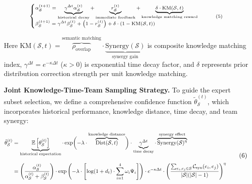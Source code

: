 \begin{equation}
\scriptsize
\begin{cases}
\alpha_{\mathcal{S}}^{(t+1)} = \underbrace{\gamma^{\Delta t} \alpha_{\mathcal{S}}^{(t)}}_{\text{historical decay}} 
+ \underbrace{r_{\mathcal{S}}^{(t)}}_{\text{immediate feedback}} 
+ \underbrace{\delta \cdot \mathrm{KM}(\mathcal{S}, t)}_{\text{knowledge matching reward}} \\[8pt]
\beta_{\mathcal{S}}^{(t+1)} = \gamma^{\Delta t} \beta_{\mathcal{S}}^{(t)} 
+ \left(1 - r_{\mathcal{S}}^{(t)}\right) 
+ \delta \cdot \left(1 - \mathrm{KM}(\mathcal{S}, t)\right)
\end{cases} 
\tag{5} 
\label{eq:emc5}
\end{equation}

Here $\mathrm{KM}(\mathcal{S}, t) = \overbrace{\rho_{\text{overlap}}}^{\text{semantic matching}} \cdot \underbrace{\mathrm{Synergy}(\mathcal{S})}_{\text{synergy gain}}$ is composite knowledge matching index, $\gamma^{\Delta t} = e^{-\kappa \Delta t}$ ($\kappa > 0$) is exponential time decay factor, and $\delta$ represents prior distribution correction strength per unit knowledge matching.


\textbf{Joint Knowledge-Time-Team Sampling Strategy.} To guide the expert subset selection, we define a comprehensive confidence function $\tilde{\theta}_{\mathcal{S}}^{(t)}$, which incorporates historical performance, knowledge distance, time decay, and team synergy:

\begin{equation}
\resizebox{\linewidth}{!}{$%
\begin{aligned}
\tilde{\theta}_{\mathcal{S}}^{(t)} &= \underbrace{\mathbb{E}\left[\theta_{\mathcal{S}}^{(t)}\right]}_{\text{historical expectation}} 
\cdot \exp\biggl( -\lambda \cdot \overbrace{\text{Dist}(\mathcal{S}, t)}^{\text{knowledge distance}} \biggr) 
\cdot \underbrace{\gamma^{\Delta t}}_{\text{time decay}} 
\cdot \overbrace{\mathrm{Synergy}(\mathcal{S})^\eta}^{\text{synergy effect}} \\[8pt]
&= \left( \frac{\alpha_{\mathcal{S}}^{(t)}}{\alpha_{\mathcal{S}}^{(t)} + \beta_{\mathcal{S}}^{(t)}} \right) 
\cdot \exp\left( -\lambda \cdot \left[ \log(1 + d_t) \cdot \sum_{i=1}^4 \omega_i \Psi_i \right] \right) 
\cdot e^{-\kappa \Delta t} 
\cdot \left( \frac{\sum_{e_i,e_j \in \mathcal{S}} \mathcal{C}_{\text{syn}}(e_i,e_j)}{|\mathcal{S}|(|\mathcal{S}|-1)} \right)^\eta 
\end{aligned}
$}
\tag{6} 
\label{eq:emc6}
\end{equation}

